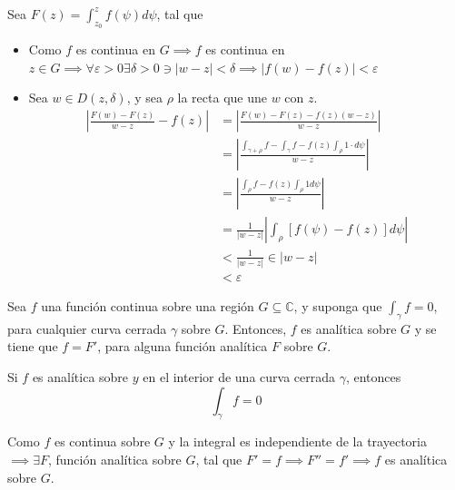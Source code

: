 \begin{lema}
\begin{dem}
\begin{figure}[H]
        \end{figure}
            Sea $F(z)=\int_{z_0}^zf(\psi)d\psi$, tal que 
            \begin{itemize}
                \item Como $f$ es continua en $G\implies f$ es continua en $z\in G\implies \forall \varepsilon>0\exists \delta>0\ni |w-z|<\delta \implies  |f(w)-f(z)|<\varepsilon$
                \item Sea $w\in D(z,\delta)$, y sea $\rho$ la recta que une $w$ con $z$. \begin{align*}
                    \left|\frac{F(w)-F(z)}{w-z}-f(z)\right| &=\left| \frac{F(w)-F(z)-f(z)(w-z)}{w-z}\right|\\
                    &= \left|\frac{\int_{\gamma+\rho}f - \int_\gamma f - f(z)\int_\rho 1\cdot d\psi}{w-z}\right|\\
                    &= \left| \frac{\int_\rho f- f(z)\int_\rho 1d\psi}{w-z}\right|\\
                    &= \frac{1}{|w-z|} \left| \int_\rho[f(\psi)-f(z)]d\psi\right|\\
                    &<\frac{1}{|w-z|}\in |w-z|\\
                    &< \varepsilon
                \end{align*}
            \end{itemize}
        
    \end{dem}
\end{lema}

\begin{teorema}[Morera]
    Sea $f$ una función continua sobre una región $G\subseteq \mathbb{C}$, y suponga que $\int_\gamma f=0$, para cualquier curva cerrada $\gamma$ sobre $G$. Entonces, $f$ es analítica sobre $G$ y se tiene que $f=F'$, para alguna función analítica $F$ sobre $G$.  
\end{teorema}
\begin{cajita}
    \begin{teorema}
        Si $f$ es analítica sobre $y$ en el interior de una curva cerrada $\gamma$, entonces 
        $$\int_\gamma f=0$$ 
    \end{teorema}
\end{cajita}
\begin{dem}
    Como $f$ es continua sobre $G$ y la integral es independiente de la trayectoria $\implies \exists F$, función analítica sobre $G$, tal que $F'=f\implies F'' = f'\implies f$ es analítica sobre $G$. 
\end{dem}


